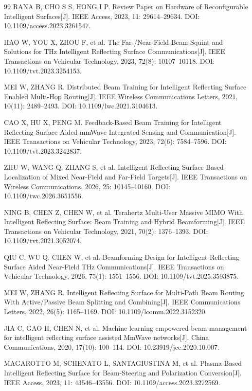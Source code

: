 \begin{thebibliography}{99}
 RANA B, CHO S S, HONG I P. Review Paper on Hardware of Reconfigurable Intelligent Surfaces[J]. IEEE Access, 2023, 11: 29614--29634. DOI: 10.1109/access.2023.3261547.

 HAO W, YOU X, ZHOU F, et al. The Far-/Near-Field Beam Squint and Solutions for THz Intelligent Reflecting Surface Communications[J]. IEEE Transactions on Vehicular Technology, 2023, 72(8): 10107--10118. DOI: 10.1109/tvt.2023.3254153.

 MEI W, ZHANG R. Distributed Beam Training for Intelligent Reflecting Surface Enabled Multi-Hop Routing[J]. IEEE Wireless Communications Letters, 2021, 10(11): 2489--2493. DOI: 10.1109/lwc.2021.3104613.

 CAO X, HU X, PENG M. Feedback-Based Beam Training for Intelligent Reflecting Surface Aided mmWave Integrated Sensing and Communication[J]. IEEE Transactions on Vehicular Technology, 2023, 72(6): 7584--7596. DOI: 10.1109/tvt.2023.3242837.

 ZHU W, WANG Q, ZHANG S, et al. Intelligent Reflecting Surface-Based Localization of Mixed Near-Field and Far-Field Targets[J]. IEEE Transactions on Wireless Communications, 2026, 25: 10145--10160. DOI: 10.1109/twc.2026.3651556.

 NING B, CHEN Z, CHEN W, et al. Terahertz Multi-User Massive MIMO With Intelligent Reflecting Surface: Beam Training and Hybrid Beamforming[J]. IEEE Transactions on Vehicular Technology, 2021, 70(2): 1376--1393. DOI: 10.1109/tvt.2021.3052074.

 QIU C, WU Q, CHEN W, et al. Beamforming Design for Intelligent Reflecting Surface Aided Near-Field THz Communications[J]. IEEE Transactions on Vehicular Technology, 2026, 75(1): 1551--1556. DOI: 10.1109/tvt.2025.3593875.

 MEI W, ZHANG R. Intelligent Reflecting Surface for Multi-Path Beam Routing With Active/Passive Beam Splitting and Combining[J]. IEEE Communications Letters, 2022, 26(5): 1165--1169. DOI: 10.1109/lcomm.2022.3152320.

 JIA C, GAO H, CHEN N, et al. Machine learning empowered beam management for intelligent reflecting surface assisted MmWave networks[J]. China Communications, 2020, 17(10): 100--114. DOI: 10.23919/jcc.2020.10.007.

 MAGAROTTO M, SCHENATO L, SANTAGIUSTINA M, et al. Plasma-Based Intelligent Reflecting Surface for Beam-Steering and Polarization Conversion[J]. IEEE Access, 2023, 11: 43546--43556. DOI: 10.1109/access.2023.3272569.


\end{thebibliography}
